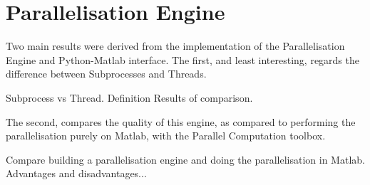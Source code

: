 \section{Parallelisation Engine}
\label{sec:res_parallel_engine}

Two main results were derived from the implementation of the Parallelisation Engine and Python-Matlab interface. The first, and least interesting, regards the difference between Subprocesses and Threads.

Subprocess vs Thread. 
Definition
Results of comparison.








The second, compares the quality of this engine, as compared to performing the parallelisation purely on Matlab, with the Parallel Computation toolbox.

Compare building a parallelisation engine and doing the parallelisation in Matlab. Advantages and disadvantages...
